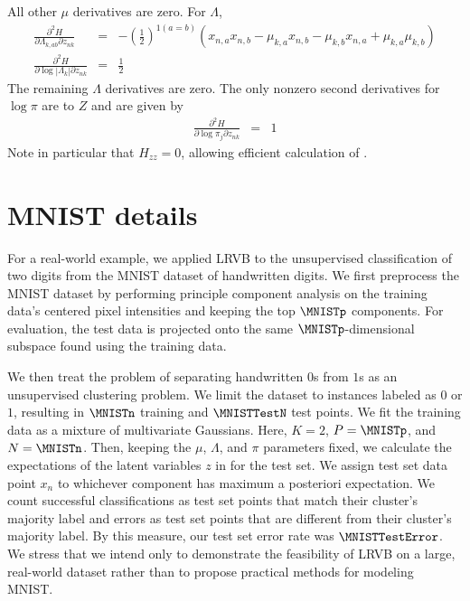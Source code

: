 %
All other $\mu$ derivatives are zero. For $\Lambda$,
%
\begin{eqnarray*}
\frac{\partial^{2}H}{\partial\Lambda_{k,ab}\partial z_{nk}} & = & -\left(\frac{1}{2}\right)^{1(a=b)}\left(x_{n,a}x_{n,b}-\mu_{k,a}x_{n,b}-\mu_{k,b}x_{n,a}+\mu_{k,a}\mu_{k,b}\right)\\
\frac{\partial^{2}H}{\partial\log\left|\Lambda_{k}\right|\partial z_{nk}} & = & \frac{1}{2}
\end{eqnarray*}
%
The remaining $\Lambda$ derivatives are zero. The only nonzero second
derivatives for $\log\pi$ are to $Z$ and are given by
%
\begin{eqnarray*}
\frac{\partial^{2}H}{\partial\log\pi_{j}\partial z_{nk}} & = & 1
\end{eqnarray*}
%
Note in particular that $H_{zz} = 0$, allowing efficient calculation of
.

\section{MNIST details} \label{app:mnist_details}

For a real-world example,
we applied LRVB to the unsupervised classification of two digits
from the MNIST dataset of handwritten digits.
We first preprocess the MNIST dataset by performing principle component
analysis on the training data's centered pixel intensities
and keeping the top $\MNISTp$ components.
For evaluation, the test data is projected onto the same
$\MNISTp$-dimensional subspace found using the training data.

We then treat the problem of
separating handwritten $0$s from $1$s as an unsupervised clustering
problem.  We limit the dataset to instances labeled as $0$
or $1$, resulting in $\MNISTn$ training and $\MNISTTestN$ test points.
We fit the training data
as a mixture of multivariate Gaussians.  Here, $K=2$, $P=\MNISTp$, and
$N=\MNISTn$.  Then, keeping the $\mu$, $\Lambda$, and $\pi$
parameters fixed, we calculate the expectations of the
latent variables $z$ in  for the test set.
We assign test set data point $x_n$ to whichever component has
maximum a posteriori expectation.  We count successful classifications
as test set points that match their cluster's majority label
and errors as test set points that are different from their cluster's
majority label.  By this measure, our test set error rate was
$\MNISTTestError$. We stress that we intend only to demonstrate
the feasibility of LRVB on a large, real-world dataset rather than
to propose practical methods for modeling MNIST.
